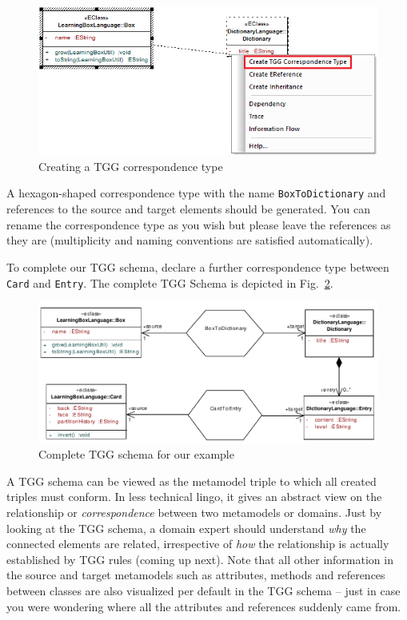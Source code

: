 \begin{figure}[htbp]
\begin{center}
  \includegraphics[width=\textwidth]{pics/tggBilder/tggSchema/tgg5.png}
  \caption{Creating a TGG correspondence type} 
  \label{fig:create_correspondence}
\end{center}
\end{figure}

A hexagon-shaped correspondence type with the name \texttt{BoxToDiction\-ary} and references to the source and target elements should be generated.
You can rename the correspondence type as you wish but please leave the references as they are (multiplicity and naming conventions are satisfied automatically).

To complete our TGG schema, declare a further correspondence type between \texttt{Card} and \texttt{Entry}.
The complete TGG Schema is depicted in Fig.~\ref{fig:complete_tgg_schema}.

\begin{figure}[htbp]
\begin{center}
  \includegraphics[width=\textwidth]{pics/tggBilder/tggSchema/tgg7}
  \caption{Complete TGG schema for our example}
  \label{fig:complete_tgg_schema}
\end{center}
\end{figure}

A TGG schema can be viewed as the metamodel triple to which all created triples must conform.
In less technical lingo, it gives an abstract view on the relationship or \emph{correspondence} between two metamodels or domains.
Just by looking at the TGG schema, a domain expert should understand \emph{why} the connected elements are related, irrespective of \emph{how} the relationship is actually established by TGG rules (coming up next).
Note that all other information in the source and target metamodels such as attributes, methods and references between classes are also visualized per default in the TGG schema -- just in case you were wondering where all the attributes and references suddenly came from.